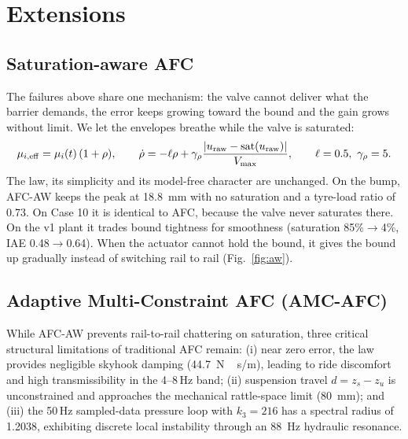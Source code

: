 \documentclass[10pt,a4paper]{article}
\begin{document}
\FloatBarrier
\section{Extensions}
\subsection{Saturation-aware AFC}
The failures above share one mechanism: the valve cannot deliver what the barrier demands, the error keeps growing toward the bound and the gain grows without limit. We let the envelopes breathe while the valve is saturated:
\begin{equation}
\mu_{i,\rm eff}=\mu_i(t)\,(1+\rho),\qquad \dot\rho=-\ell\rho+\gamma_\rho\frac{|u_{\rm raw}-\operatorname{sat}(u_{\rm raw})|}{V_{\max}},\qquad \ell=0.5,\ \gamma_\rho=5.
\end{equation}
The law, its simplicity and its model-free character are unchanged. On the bump, AFC-AW keeps the peak at \SI{18.8}{mm} with no saturation and a tyre-load ratio of 0.73. On Case 10 it is identical to AFC, because the valve never saturates there. On the v1 plant it trades bound tightness for smoothness (saturation 85\%\(\to\)4\%, IAE 0.48\(\to\)0.64). When the actuator cannot hold the bound, it gives the bound up gradually instead of switching rail to rail (Fig.~\ref{fig:aw}).

\subsection{Adaptive Multi-Constraint AFC (AMC-AFC)}
\label{sec:amc_afc}
While AFC-AW prevents rail-to-rail chattering on saturation, three critical structural limitations of traditional AFC remain: (i) near zero error, the law provides negligible skyhook damping (\SI{44.7}{N\,s/m}), leading to ride discomfort and high transmissibility in the 4--8\,Hz band; (ii) suspension travel \(d = z_s - z_u\) is unconstrained and approaches the mechanical rattle-space limit (\SI{80}{mm}); and (iii) the 50\,Hz sampled-data pressure loop with \(k_3=216\) has a spectral radius of 1.2038, exhibiting discrete local instability through an \SI{88}{Hz} hydraulic resonance.
\end{document}
